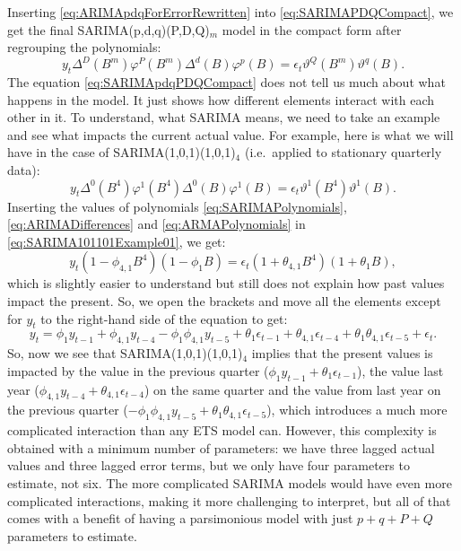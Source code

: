 \documentclass[]{book}
\theoremstyle{definition}
\theoremstyle{definition}
\theoremstyle{definition}
\theoremstyle{definition}
\theoremstyle{remark}
\begin{document}
Inserting \eqref{eq:ARIMApdqForErrorRewritten} into \eqref{eq:SARIMAPDQCompact}, we get the final SARIMA(p,d,q)(P,D,Q)\(_m\) model in the compact form after regrouping the polynomials:
\begin{equation}
  y_t \Delta^D(B^m) \varphi^P(B^m) \Delta^d(B) \varphi^p(B) = \epsilon_t \vartheta^Q(B^m) \vartheta^q(B) .
  \label{eq:SARIMApdqPDQCompact}
\end{equation}
The equation \eqref{eq:SARIMApdqPDQCompact} does not tell us much about what happens in the model. It just shows how different elements interact with each other in it. To understand, what SARIMA means, we need to take an example and see what impacts the current actual value. For example, here is what we will have in the case of SARIMA(1,0,1)(1,0,1)\(_4\) (i.e.~applied to stationary quarterly data):
\begin{equation}
  y_t \Delta^0(B^4) \varphi^1(B^4) \Delta^0(B) \varphi^1(B) = \epsilon_t \vartheta^1(B^4) \vartheta^1(B) .
  \label{eq:SARIMA101101Example01}
\end{equation}
Inserting the values of polynomials \eqref{eq:SARIMAPolynomials}, \eqref{eq:ARIMADifferences} and \eqref{eq:ARMAPolynomials} in \eqref{eq:SARIMA101101Example01}, we get:
\begin{equation}
  y_t (1 -\phi_{4,1} B^4)(1 -\phi_{1} B) = \epsilon_t (1 + \theta_{4,1} B^4) (1 + \theta_{1} B),
  \label{eq:SARIMA101101Example02}
\end{equation}
which is slightly easier to understand but still does not explain how past values impact the present. So, we open the brackets and move all the elements except for \(y_t\) to the right-hand side of the equation to get:
\begin{equation}
  y_t = \phi_{1} y_{t-1} + \phi_{4,1} y_{t-4} -\phi_{1} \phi_{4,1} y_{t-5} + \theta_1 \epsilon_{t-1} + \theta_{4,1} \epsilon_{t-4} + \theta_{1} \theta_{4,1} \epsilon_{t-5} + \epsilon_t .
  \label{eq:SARIMA101101Example03}
\end{equation}
So, now we see that SARIMA(1,0,1)(1,0,1)\(_4\) implies that the present values is impacted by the value in the previous quarter (\(\phi_{1} y_{t-1} + \theta_1 \epsilon_{t-1}\)), the value last year (\(\phi_{4,1} y_{t-4} + \theta_{4,1} \epsilon_{t-4}\)) on the same quarter and the value from last year on the previous quarter (\(-\phi_{1} \phi_{4,1} y_{t-5} + \theta_{1} \theta_{4,1} \epsilon_{t-5}\)), which introduces a much more complicated interaction than any ETS model can. However, this complexity is obtained with a minimum number of parameters: we have three lagged actual values and three lagged error terms, but we only have four parameters to estimate, not six. The more complicated SARIMA models would have even more complicated interactions, making it more challenging to interpret, but all of that comes with a benefit of having a parsimonious model with just \(p+q+P+Q\) parameters to estimate.
\end{document}
